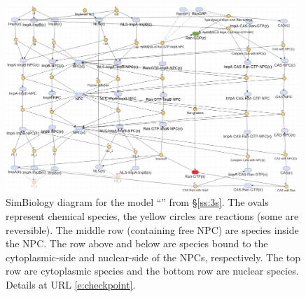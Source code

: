 \documentclass[12pt,notitlepage]{article}
\begin{document}
\begin{figure} %
	\centering
	\includegraphics[width=0.99\textwidth]{20211018-Appli/threestage}
	\caption{%
		SimBiology diagram for the model 
		``'' from \S\ref{ss:3s}.
		The ovals represent chemical species,
		the yellow circles are reactions
		(some are reversible).
		The middle row (containing free NPC)
		are species inside the NPC.
		The row above and below are species
		bound to 
		the cytoplasmic-side and nuclear-side 
		of the NPCs, respectively.
		The top row are cytoplasmic species
		and
		the bottom row are nuclear species.
		Details at URL \eqref{e:checkpoint}.
	}
	\label{f:app:3s-simbio}
\end{figure}


\clearpage %
\end{document}

